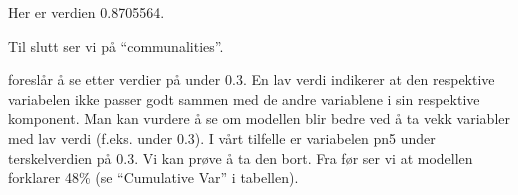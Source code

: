 \documentclass[
]{article}
\newenvironment{Shaded}{\begin{snugshade}}{\end{snugshade}}
\newcommand{\CommentTok}[1]{\textcolor[rgb]{0.56,0.35,0.01}{\textit{#1}}}
\newcommand{\FunctionTok}[1]{\textcolor[rgb]{0.00,0.00,0.00}{#1}}
\newcommand{\NormalTok}[1]{#1}
\newcommand{\SpecialCharTok}[1]{\textcolor[rgb]{0.00,0.00,0.00}{#1}}
\begin{document}
Her er verdien 0.8705564.

Til slutt ser vi på ``communalities''.

\begin{Shaded}
\end{Shaded}

\citet{pallantSPSSSurvivalManual2010} foreslår å se etter verdier på under 0.3. En lav verdi indikerer at den respektive variabelen ikke passer godt sammen med de andre variablene i sin respektive komponent. Man kan vurdere å se om modellen blir bedre ved å ta vekk variabler med lav verdi (f.eks. under 0.3). I vårt tilfelle er variabelen pn5 under terskelverdien på 0.3. Vi kan prøve å ta den bort. Fra før ser vi at modellen forklarer 48\% (se ``Cumulative Var'' i tabellen).
\end{document}
